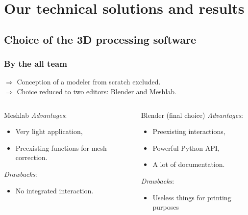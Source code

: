 \documentclass{beamer}
\begin{document}
\section{Our technical solutions and results}

\subsection{Choice of the 3D processing software}
\begin{frame}
	\frametitle{By the all team}
		\small $\Longrightarrow$ Conception of a modeler from scratch excluded. \\
		\small $\Longrightarrow$ Choice reduced to two editors: Blender and Meshlab.
    \begin{columns}[t]
  	\begin{column}{5cm}
  		\begin{block}{Meshlab}
  		\small \textit{Advantages}:
  		\begin{itemize}
  		\item Very light application,
  		\item Preexisting functions for mesh correction.
  		\end{itemize}
  		
  		\small \textit{Drawbacks}:
  		\begin{itemize}
  		\item No integrated interaction.
  		\end{itemize}
 	 	\end{block}   
  	\end{column}
  
  	\begin{column}{6cm}
  		\begin{block}{Blender (final choice)}
  		\small \textit{Advantages}:
  		\begin{itemize}
  		\item Preexisting interactions,
  		\item Powerful Python API,
  		\item A lot of documentation.
  		\end{itemize}
  		
  		\small \textit{Drawbacks}:
  		\begin{itemize}
  		\item Useless things for printing purposes
  		\end{itemize}
 	 	\end{block}   
  	\end{column}
 	\end{columns}  
    
\end{frame}
\end{document}
